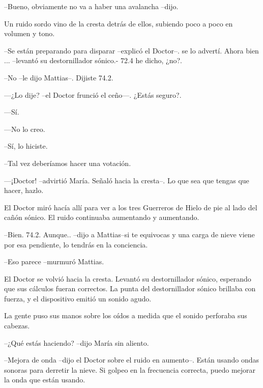 --Bueno, obviamente no va a haber una avalancha --dijo.



Un ruido sordo vino de la cresta detrás de ellos, subiendo poco a poco en volumen y tono.



--Se están preparando para disparar --explicó el Doctor--. se lo advertí. Ahora bien ... --levantó su destornillador sónico.- 72.4 he dicho, ¿no?.



--No --le dijo Mattias--. Dijiste 74.2.



—¿Lo dije? --el Doctor frunció el ceño—. ¿Estás seguro?.



—Sí.



—No lo creo.



--Sí, lo hiciste.



--Tal vez deberíamos hacer una votación.



—¡Doctor! --advirtió María. Señaló hacia la cresta--. Lo que sea que tengas que hacer, hazlo.



El Doctor miró hacía allí para ver a los tres Guerreros de Hielo de pie al lado del cañón sónico. El ruido continuaba aumentando y aumentando.



--Bien. 74.2.  Aunque.. --dijo a Mattias--si te equivocas y una carga de nieve viene por esa pendiente, lo tendrás en la conciencia.



--Eso parece --murmuró Mattias.


El Doctor se volvió hacia la cresta. Levantó su destornillador sónico, esperando que sus cálculos fueran correctos. La punta del destornillador sónico brillaba con fuerza, y el dispositivo emitió un sonido agudo.



La gente puso sus manos sobre los oídos a medida que el sonido perforaba sus cabezas.



--¿Qué estás haciendo? --dijo María sin aliento.



--Mejora de onda --dijo el Doctor sobre el ruido en aumento--. Están usando ondas sonoras para derretir la nieve. Si golpeo en la frecuencia correcta, puedo mejorar la onda que están usando.



